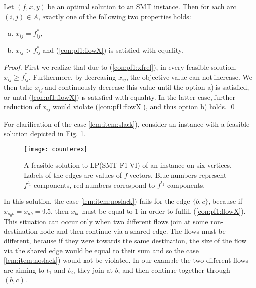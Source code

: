 \begin{lemma}\label{lem:xequals} Let $(f,x,y)$ be an optimal solution to an SMT instance. Then for each arc $(i,j)\in A$, exactly one of the following two properties holds:
\begin{enumerate}[a)]
\item\label{lem:item:noslack} $x_{ij}=f^*_{ij},$
\item\label{lem:item:slack} $x_{ij} > f^*_{ij}$ and (\ref{con:pf1:flowX}) is satisfied with equality.
\end{enumerate}

\end{lemma}
\begin{proof}
First we realize that due to (\ref{con:pf1:xfrel}), in every feasible solution, $x_{ij}\geq f^*_{ij}$. Furthermore, by decreasing $x_{ij}$, the objective value can not increase. We then take $x_{ij}$ and continuously decrease this value until the option a) is satisfied, or until  (\ref{con:pf1:flowX}) is satisfied with equality. In the latter case, further reduction of $x_{ij}$ would violate (\ref{con:pf1:flowX}), and thus option b) holds. \qed
\end{proof}
For clarification of the case \ref{lem:item:slack}), consider an instance with a feasible solution depicted in Fig. \ref{fig:counterex}.
\begin{figure}[h!]
        \centering
        \texttt{[image: counterex]}
        \caption{A feasible solution to LP(SMT-F1-VI) of an instance on six vertices. Labels of the edges are values of $f$-vectors. Blue numbers represent $f^{t_1}$ components, red numbers correspond to $f^{t_2}$ components.} 
                \label{fig:counterex}
\end{figure}
In this solution, the case \ref{lem:item:noslack}) fails for the edge $\{b,c\}$, because if $x_{s_0b}=x_{ab}=0.5$, then $x_{bc}$ must be equal to 1 in order to fulfill (\ref{con:pf1:flowX}). This situation can occur only when two different flows join at some non-destination node and then continue via a shared edge. The flows must be different, because if they were towards the same destination, the size of the flow via the shared edge would be equal to their sum and so the case \ref{lem:item:noslack}) would not be violated. In our example the two different flows are aiming to $t_1$ and $t_2$, they join at $b$, and then continue together through $(b,c)$.


